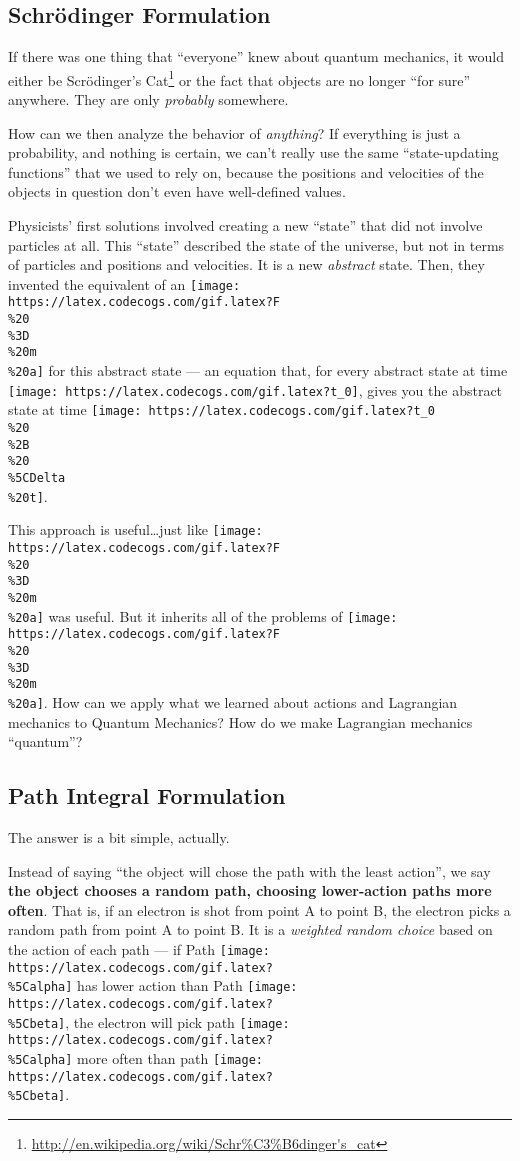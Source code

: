 \documentclass[]{article}
\renewcommand{\href}[2]{#2\footnote{\url{#1}}}
\begin{document}
\subsection{Schrödinger Formulation}\label{schruxf6dinger-formulation}

If there was one thing that ``everyone'' knew about quantum mechanics, it would
either be
\href{http://en.wikipedia.org/wiki/Schr\%C3\%B6dinger's_cat}{Scrödinger's Cat}
or the fact that objects are no longer ``for sure'' anywhere. They are only
\emph{probably} somewhere.

How can we then analyze the behavior of \emph{anything}? If everything is just a
probability, and nothing is certain, we can't really use the same
``state-updating functions'' that we used to rely on, because the positions and
velocities of the objects in question don't even have well-defined values.

Physicists' first solutions involved creating a new ``state'' that did not
involve particles at all. This ``state'' described the state of the universe,
but not in terms of particles and positions and velocities. It is a new
\emph{abstract} state. Then, they invented the equivalent of an
\texttt{[image: https://latex.codecogs.com/gif.latex?F\\\%20\\\%3D\\\%20m\\\%20a]} for
this abstract state --- an equation that, for every abstract state at time
\texttt{[image: https://latex.codecogs.com/gif.latex?t\_0]}, gives you the
abstract state at time
\texttt{[image: https://latex.codecogs.com/gif.latex?t\_0\\\%20\\\%2B\\\%20\\\%5CDelta\\\%20t]}.

This approach is useful\ldots{}just like
\texttt{[image: https://latex.codecogs.com/gif.latex?F\\\%20\\\%3D\\\%20m\\\%20a]} was
useful. But it inherits all of the problems of
\texttt{[image: https://latex.codecogs.com/gif.latex?F\\\%20\\\%3D\\\%20m\\\%20a]}. How
can we apply what we learned about actions and Lagrangian mechanics to Quantum
Mechanics? How do we make Lagrangian mechanics ``quantum''?

\subsection{Path Integral Formulation}\label{path-integral-formulation}

The answer is a bit simple, actually.

Instead of saying ``the object will chose the path with the least action'', we
say \textbf{the object chooses a random path, choosing lower-action paths more
often}. That is, if an electron is shot from point A to point B, the electron
picks a random path from point A to point B. It is a \emph{weighted random
choice} based on the action of each path --- if Path
\texttt{[image: https://latex.codecogs.com/gif.latex?\\\%5Calpha]} has lower
action than Path
\texttt{[image: https://latex.codecogs.com/gif.latex?\\\%5Cbeta]}, the electron
will pick path \texttt{[image: https://latex.codecogs.com/gif.latex?\\\%5Calpha]}
more often than path
\texttt{[image: https://latex.codecogs.com/gif.latex?\\\%5Cbeta]}.
\end{document}
